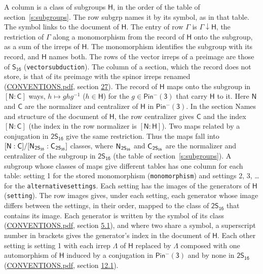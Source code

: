 \documentclass[10pt,a4paper]{article}
\numberwithin{equation}{section}
\newcommand{\grp}[1]{\mathsf{#1}}
\newcommand{\grpindex}[2]{[#1 : #2]}
\newcommand{\restr}[2]{#1\!\downarrow#2}
\newcommand{\hairsp}{\mkern1mu}
\begin{document}
A column is a class of subgroups $\grp{H}$, in the order of the table of section~\ref{s:subgroups}. The row subgrp names it by its symbol, as in that table. The symbol links to the document of $\grp{H}$. The entry of row $\Gamma$ is $\restr{\Gamma}{\grp{H}}$, the restriction of $\Gamma$ along a monomorphism from the record of $\grp{H}$ onto the subgroup, as a sum of the irreps of $\grp{H}$. The monomorphism identifies the subgroup with its record, and $\grp{H}$ names both. The rows of the vector irreps of a preimage are those of \href{../../../rotation/data/pdf/S16.pdf}{$\grp{S_{16}}$} (\texttt{vectorsubduction}). The column of a section, which the record does not store, is that of its preimage with the spinor irreps renamed (\href{../../CONVENTIONS.pdf}{CONVENTIONS.pdf}, section \href{../../CONVENTIONS.pdf\#conv.27}{27}). \label{n:group.normalizer.o3}\label{n:group.centralizer.o3}\label{n:element.h}The record of $\grp{H}$ maps onto the subgroup in $\grpindex{\grp{N}}{\grp{C}}$ ways, $h \mapsto g h g^{-1}$ ($h \in \grp{H}$) for the $g \in \grp{Pin^{-}(3)}$ that carry $\grp{H}$ to it. Here $\grp{N}$ and $\grp{C}$ are the normalizer and centralizer of $\grp{H}$ in \href{Pinminus3.pdf}{$\grp{Pin^{-}(3)}$}. In the section Names and structure of the document of $\grp{H}$, the row centralizer gives $\grp{C}$ and the index $\grpindex{\grp{N}}{\grp{C}}$ (the index in the row normalizer is $\grpindex{\grp{N}}{\grp{H}}$). Two maps related by a conjugation in $\grp{2S_{16}}$ give the same restriction. Thus the maps fall into $\grpindex{\grp{N}}{\grp{C}}/\grpindex{\grp{N}_{\hairsp \grp{2S_{16}}}}{\grp{C}_{\hairsp \grp{2S_{16}}}}$ classes, where $\grp{N}_{\hairsp \grp{2S_{16}}}$ and $\grp{C}_{\hairsp \grp{2S_{16}}}$ are the normalizer and centralizer of the subgroup in $\grp{2S_{16}}$ (the table of section~\ref{s:subgroups}). \label{n:head.setting}A subgroup whose classes of maps give different tables has one column for each table: setting 1 for the stored monomorphism (\texttt{monomorphism}) and settings 2, 3, \dots{} for the \texttt{alternativesettings}. Each setting has the images of the generators of $\grp{H}$ (\texttt{setting}). \label{n:head.images}The row images gives, under each setting, each generator whose image differs between the settings, in their order, mapped to the class of $\grp{2S_{16}}$ that contains its image. Each generator is written by the symbol of its class (\href{../../CONVENTIONS.pdf}{CONVENTIONS.pdf}, section \href{../../../rotation/CONVENTIONS.pdf\#conv.5.1}{5.1}), and where two share a symbol, a superscript number in brackets gives the generator's index in the document of $\grp{H}$. \label{n:irrep.Delta}Each other setting is setting 1 with each irrep $\Lambda$ of $\grp{H}$ replaced by $\Lambda$ composed with one automorphism of $\grp{H}$ induced by a conjugation in \href{Pinminus3.pdf}{$\grp{Pin^{-}(3)}$} and by none in $\grp{2S_{16}}$ (\href{../../CONVENTIONS.pdf}{CONVENTIONS.pdf}, section \href{../../../rotation/CONVENTIONS.pdf\#conv.12.1}{12.1}).
\end{document}
